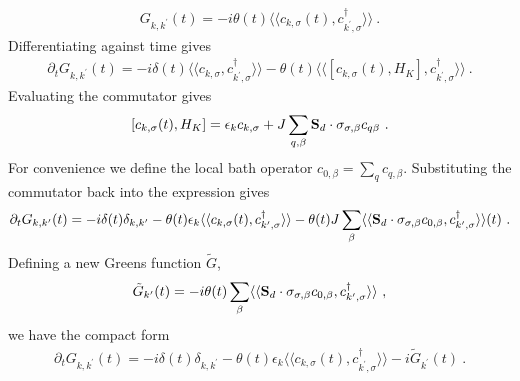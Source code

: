 \begin{equation}\begin{aligned}
	G_{k,k^\prime}(t) = -i \theta(t) \langle \langle c_{k,\sigma}(t), c^\dagger_{k^\prime,\sigma} \rangle  \rangle~.
\end{aligned}\end{equation}
Differentiating against time gives
\begin{equation}\begin{aligned}
	\partial_t G_{k,k^\prime}(t) = -i \delta(t) \langle \langle c_{k,\sigma}, c^\dagger_{k^\prime,\sigma} \rangle  \rangle - \theta(t) \langle \langle [ c_{k,\sigma}(t), H_K ], c^\dagger_{k^\prime,\sigma} \rangle  \rangle~.
\end{aligned}\end{equation}
Evaluating the commutator gives
\begin{equation}\begin{aligned}
	\relax[ c_{k,\sigma}(t), H_K ] = \epsilon_k c_{k,\sigma} + J\sum_{q,\beta} {\bf S}_d\cdot \sigma_{\sigma,\beta} c_{q\beta}~.
\end{aligned}\end{equation}
For convenience we define the local bath operator \(c_{0,\beta} = \sum_q c_{q,\beta}\). Substituting the commutator back into the expression gives
\begin{equation}\begin{aligned}
	\partial_t G_{k,k^\prime}(t) = -i \delta(t) \delta_{k,k^\prime} - \theta(t) \epsilon_k \langle \langle c_{k,\sigma}(t), c^\dagger_{k^\prime,\sigma} \rangle  \rangle - \theta(t) J \sum_\beta \langle \langle {\bf S}_d\cdot \sigma_{\sigma,\beta} c_{0,\beta}, c^\dagger_{k^\prime,\sigma} \rangle  \rangle(t)~.
\end{aligned}\end{equation}
Defining a new Greens function \(\tilde G\),
\begin{equation}\begin{aligned}
	\tilde G_{k^\prime}(t) = -i\theta(t)\sum_\beta \langle \langle {\bf S}_d\cdot \sigma_{\sigma,\beta} c_{0,\beta}, c^\dagger_{k^\prime,\sigma} \rangle  \rangle~,
\end{aligned}\end{equation}
we have the compact form
\begin{equation}\begin{aligned}
	\partial_t G_{k,k^\prime}(t) = -i \delta(t) \delta_{k,k^\prime} - \theta(t) \epsilon_k \langle \langle c_{k,\sigma}(t), c^\dagger_{k^\prime,\sigma} \rangle  \rangle - i \tilde G_{k^\prime}(t)~.
\end{aligned}\end{equation}
